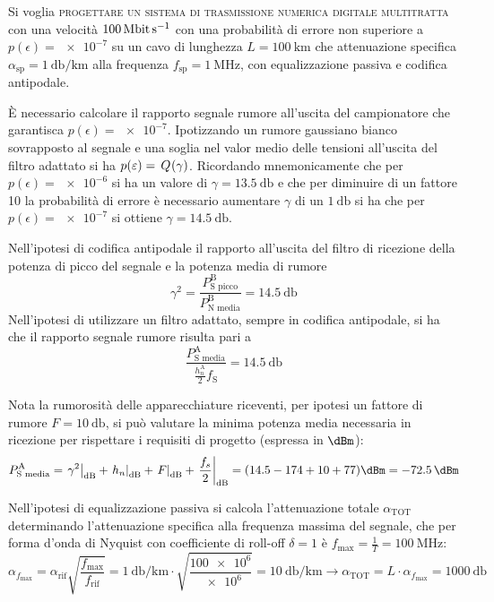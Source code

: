 \begin{esercizio}
	Si voglia \textsc{progettare un sistema di trasmissione numerica digitale multitratta} con una velocità $\SI{100}{\mega\bit\per\second}$ con una probabilità di errore non superiore a $p(\epsilon)=\num{e-7}$ su un cavo di lunghezza $L=\SI{100}{\kilo\meter}$ che attenuazione specifica $\alpha_\text{sp}=\SI{1}{\decibel\per\kilo\meter}$ alla frequenza $f_\text{sp}=\SI{1}{\mega\hertz}$, con equalizzazione passiva e codifica antipodale.
\end{esercizio}

\`{E} necessario calcolare il rapporto segnale rumore all'uscita del campionatore che garantisca $p(\epsilon)=\num{e-7}$. Ipotizzando un rumore gaussiano bianco sovrapposto al segnale e una soglia nel valor medio delle tensioni all'uscita del filtro adattato si ha $p(\varepsilon)=\,{Q}^{}\!\left({\gamma}\right)$. Ricordando mnemonicamente che per $p(\epsilon)=\num{e-6}$ si ha un valore di $\gamma=\SI{13.5}{\decibel}$ e che per diminuire di un fattore 10 la probabilità di errore è necessario aumentare $\gamma$ di un $\SI{1}{\decibel}$ si ha che per $p(\epsilon)=\num{e-7}$ si ottiene $\gamma=\SI{14.5}{\decibel}$.

Nell'ipotesi di codifica antipodale il rapporto all'uscita del filtro di ricezione della potenza di picco del segnale e la potenza media di rumore
\[\gamma^2=\frac{P_\text{S picco}^\text{B}}{P_\text{N media}^\text{B}}=\SI{14.5}{\decibel}\]
Nell'ipotesi di utilizzare un filtro adattato, sempre in codifica antipodale, si ha che il rapporto segnale rumore risulta pari a
\[\frac{P_\text{S media}^\text{A}}{\frac{h_n^\text{A}}{2} f_\text{S}}=\SI{14.5}{\decibel}\]

Nota la rumorosità delle apparecchiature riceventi, per ipotesi un fattore di rumore $F=\SI{10}{\decibel}$, si può valutare la minima potenza media necessaria in ricezione per rispettare i requisiti di progetto (espressa in $\si{\dBm}$):
\[P_\text{S media}^\text{A}=\restrict{\gamma^2}{\si{\decibel}}+\restrict{h_n}{\si{\decibel}}+\restrict{F}{\si{\decibel}}+\restrict{\frac{f_s}{2}}{\si{\decibel}}=(\num{14.5}-174+10+77)\si{\dBm}=\SI{-72.5}{\dBm}\]

Nell'ipotesi di equalizzazione passiva si calcola l'attenuazione totale $\alpha_\text{TOT}$ determinando l'attenuazione specifica alla frequenza massima del segnale, che per forma d'onda di Nyquist con coefficiente di roll-off $\delta=1$ è $f_\text{max}=\frac{1}{T}=\SI{100}{\mega\hertz}$:
\[\alpha_{f_\text{max}}=\alpha_\text{rif}\sqrt{\frac{f_\text{max}}{f_\text{rif}}}=\SI{1}{\decibel\per\kilo\meter}\cdot\sqrt{\frac{\num{100e6}}{\num{e6}}}=\SI{10}{\decibel\per\kilo\meter}\to \alpha_\text{TOT}=L\cdot\alpha_{f_\text{max}}=\SI{1000}{\decibel}\]

